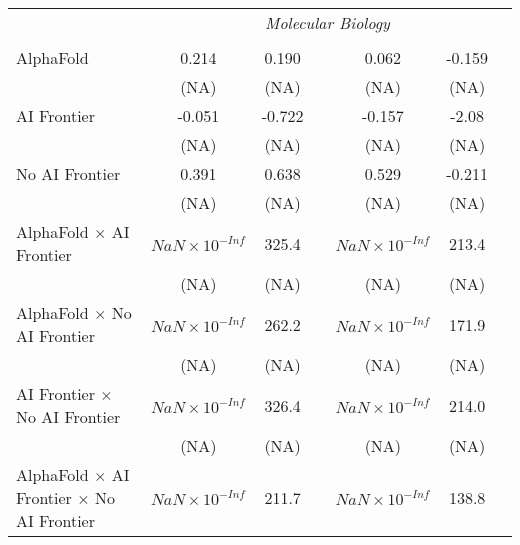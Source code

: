 \begin{tabular}{lcccccc}
 & \multicolumn{6}{c}{\textit{Molecular Biology}} \\ \\
   AlphaFold                                                                  & 0.214                  & 0.190  &        & 0.062                  & -0.159 &   \\   
                                                                              & (NA)                   & (NA)   &        & (NA)                   & (NA)   &   \\   
   AI Frontier                                                                & -0.051                 & -0.722 &        & -0.157                 & -2.08  &   \\   
                                                                              & (NA)                   & (NA)   &        & (NA)                   & (NA)   &   \\   
   No AI Frontier                                                             & 0.391                  & 0.638  &        & 0.529                  & -0.211 &   \\   
                                                                              & (NA)                   & (NA)   &        & (NA)                   & (NA)   &   \\   
   AlphaFold $\times$ AI Frontier                                             & $NaN\times 10^{-Inf}$  & 325.4  &        & $NaN\times 10^{-Inf}$  & 213.4  &   \\   
                                                                              & (NA)                   & (NA)   &        & (NA)                   & (NA)   &   \\   
   AlphaFold $\times$ No AI Frontier                                          & $NaN\times 10^{-Inf}$  & 262.2  &        & $NaN\times 10^{-Inf}$  & 171.9  &   \\   
                                                                              & (NA)                   & (NA)   &        & (NA)                   & (NA)   &   \\   
   AI Frontier $\times$ No AI Frontier                                        & $NaN\times 10^{-Inf}$  & 326.4  &        & $NaN\times 10^{-Inf}$  & 214.0  &   \\   
                                                                              & (NA)                   & (NA)   &        & (NA)                   & (NA)   &   \\   
   AlphaFold $\times$ AI Frontier $\times$ No AI Frontier                     & $NaN\times 10^{-Inf}$  & 211.7  &        & $NaN\times 10^{-Inf}$  & 138.8  &   \\   

\end{tabular}
